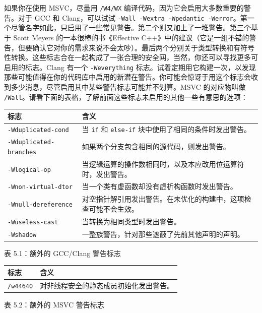 \label{idx:653}
如果你在使用 MSVC，尽量用 \texttt{/W4/WX} 编译代码，因为它会启用大多数重要的警告。对于 GCC 和 Clang，可以试试 \texttt{-Wall -Wextra -Wpedantic -Werror}。第一个尽管名字如此，只启用了一些常见警告。第二个则又加上了一堆警告。第三个基于 Scott Meyers 的一本很棒的书《Effective C++》中的建议（它是一组不错的警告，但要确认它对你的需求来说不会太吵）。最后两个分别关于类型转换和有符号性转换。这些标志合在一起构成了一张合理的安全网，当然，你还可以寻找更多可启用的标志。Clang 有一个 \texttt{-Weverything} 标志。试着定期用它构建一次，以发现那些可能值得在你的代码库中启用的新潜在警告。你可能会惊讶于用这个标志会收到多少消息，尽管启用其中某些警告标志可能并不划算。MSVC 的对应物叫做 \texttt{/Wall}。请看下面的表格，了解前面这些标志未启用的其他一些有意思的选项：

\begin{center}
\begin{tabularx}{\textwidth}{XX}
\toprule
\textbf{标志} & \textbf{含义} \\
\midrule
\texttt{-Wduplicated-cond} & 当 \texttt{if} 和 \texttt{else-if} 块中使用了相同的条件时发出警告。 \\
\texttt{-Wduplicated-branches} & 如果两个分支包含相同的源代码，则发出警告。 \\
\texttt{-Wlogical-op} & 当逻辑运算的操作数相同时，以及本应改用位运算符时，发出警告。 \\
\texttt{-Wnon-virtual-dtor} & 当一个类有虚函数却没有虚析构函数时发出警告。 \\
\texttt{-Wnull-dereference} & 对空指针解引用发出警告。在未优化的构建中，这项检查可能不会生效。 \\
\texttt{-Wuseless-cast} & 当转换为相同类型时发出警告。 \\
\texttt{-Wshadow} & 一整族警告，针对那些遮蔽了先前其他声明的声明。 \\
\bottomrule
\end{tabularx}
\end{center}

表 5.1：额外的 GCC/Clang 警告标志

\begin{center}
\begin{tabularx}{\textwidth}{XX}
\toprule
\textbf{标志} & \textbf{含义} \\
\midrule
\texttt{/w44640} & 对非线程安全的静态成员初始化发出警告。 \\
\bottomrule
\end{tabularx}
\end{center}

表 5.2：额外的 MSVC 警告标志

